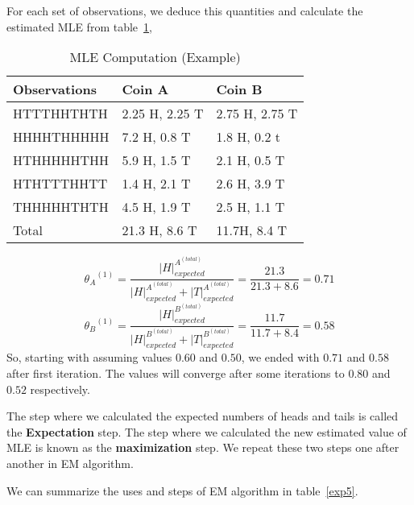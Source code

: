  


For each set of observations, we deduce this quantities and calculate the estimated MLE from table~\ref{exp4},\\
\begin{table}[h]
\centering
\caption{MLE Computation (Example)}
\label{exp4}
\begin{tabular}{|l|l|l|}
\hline
            
Observations & Coin A & Coin B \\ \hline                                                      
HTTTHHTHTH & 2.25 H, 2.25 T & 2.75 H, 2.75 T \\ \hline 
        HHHHTHHHHH & 7.2 H, 0.8 T& 1.8 H, 0.2 t\\ \hline 
                    HTHHHHHTHH & 5.9 H, 1.5 
T &  
2.1 H, 0.5 
T\\ \hline 
                    HTHTTTHHTT & 1.4 H, 2.1 T & 2.6 H, 3.9 T\\ \hline 
                    THHHHHTHTH & 4.5 H, 1.9 
T & 2.5 H, 1.1 T\\ \hline
Total & 21.3 H, 8.6 T & 11.7H, 8.4 T \\ \hline
                       
\end{tabular}
\end{table}


\[{\theta_{A}}^{(1)} =\frac{{\lvert  H \rvert}_{expected}^{A^{(total)}}}{{\lvert  H \rvert}_{expected}^{A^{(total)}}+{\lvert  T \rvert}_{expected}^{A^{(total)}}} = \frac{21.3}{21.3+8.6}=0.71\]
\[{\theta_{B}}^{(1)} = \frac{{\lvert  H \rvert}_{expected}^{B^{(total)}}}{{\lvert  H \rvert}_{expected}^{B^{(total)}}+{\lvert  T \rvert}_{expected}^{B^{(total)}}} =  \frac{11.7}{11.7+8.4}=0.58\]
 So, starting with assuming values $0.60$ and $0.50$, we ended with $0.71$ and $0.58$ after first iteration. The values will converge after some iterations to $0.80$ and $0.52$ respectively.
 
The step where we calculated the expected numbers of heads and tails is called the \textbf{Expectation} step. The step where we calculated the new estimated value of MLE is known as the \textbf{maximization} step. We repeat these two steps one after another in EM algorithm. 
 
We can summarize the uses and steps of EM algorithm in table~\ref{exp5}.


